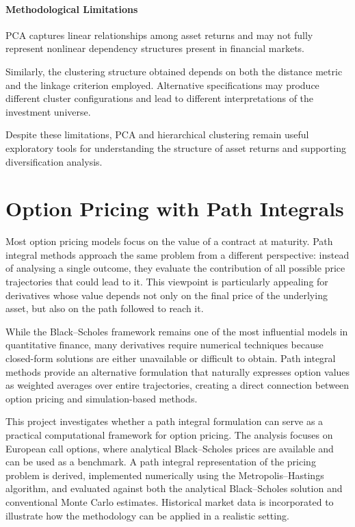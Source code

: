 \documentclass[
  12pt,
  letterpaper,
]{book}
\begin{document}
\subsubsection{Methodological
Limitations}\label{methodological-limitations}

PCA captures linear relationships among asset returns and may not fully
represent nonlinear dependency structures present in financial markets.

Similarly, the clustering structure obtained depends on both the
distance metric and the linkage criterion employed. Alternative
specifications may produce different cluster configurations and lead to
different interpretations of the investment universe.

Despite these limitations, PCA and hierarchical clustering remain useful
exploratory tools for understanding the structure of asset returns and
supporting diversification analysis.

\chapter{Option Pricing with Path
Integrals}\label{option-pricing-with-path-integrals}

Most option pricing models focus on the value of a contract at maturity.
Path integral methods approach the same problem from a different
perspective: instead of analysing a single outcome, they evaluate the
contribution of all possible price trajectories that could lead to it.
This viewpoint is particularly appealing for derivatives whose value
depends not only on the final price of the underlying asset, but also on
the path followed to reach it.

While the Black--Scholes framework remains one of the most influential
models in quantitative finance, many derivatives require numerical
techniques because closed-form solutions are either unavailable or
difficult to obtain. Path integral methods provide an alternative
formulation that naturally expresses option values as weighted averages
over entire trajectories, creating a direct connection between option
pricing and simulation-based methods.

This project investigates whether a path integral formulation can serve
as a practical computational framework for option pricing. The analysis
focuses on European call options, where analytical Black--Scholes prices
are available and can be used as a benchmark. A path integral
representation of the pricing problem is derived, implemented
numerically using the Metropolis--Hastings algorithm, and evaluated
against both the analytical Black--Scholes solution and conventional
Monte Carlo estimates. Historical market data is incorporated to
illustrate how the methodology can be applied in a realistic setting.
\end{document}
